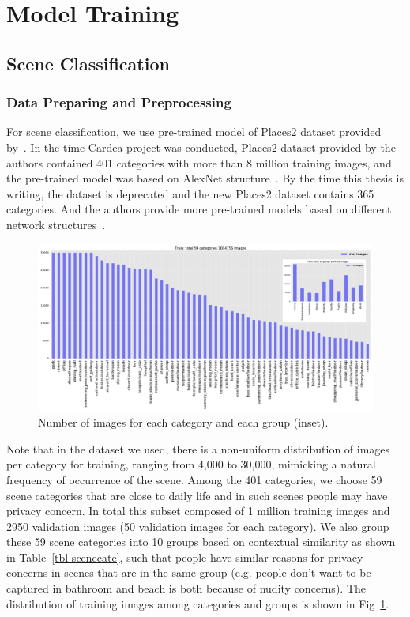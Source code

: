 \section{Model Training}

\subsection{Scene Classification}

\subsubsection{Data Preparing and Preprocessing}

For scene classification, we use pre-trained model of Places2 dataset provided by~\cite{links:places2mit}. In the time Cardea project was conducted, Places2 dataset provided by the authors contained 401 categories with more than 8 million training images, and the pre-trained model was based on AlexNet structure~\cite{krizhevsky2012imagenet}. By the time this thesis is writing, the dataset is deprecated and the new Places2 dataset contains 365 categories. And the authors provide more pre-trained models based on different network structures~\cite{links:places2pre}.

\begin{figure}[!htbp]
    \centering
    \includegraphics[width=1.0\textwidth]{figure/ch4-numdist.pdf}
    \caption{Number of images for each category and each group (inset).}
    \label{fig:ch4-scenenumdist}
\end{figure}

Note that in the dataset we used, there is a non-uniform distribution of images per category for training, ranging from 4,000 to 30,000, mimicking a natural frequency of occurrence of the scene. Among the 401 categories, we choose 59 scene categories that are close to daily life and in such scenes people may have privacy concern. In total this subset composed of 1 million training images and 2950 validation images (50 validation images for each category). We also group these 59 scene categories into 10 groups based on contextual similarity as shown in Table~\ref{tbl-scenecate}, such that people have similar reasons for privacy concerns in scenes that are in the same group (e.g. people don't want to be captured in bathroom and beach is both because of nudity concerns). The distribution of training images among categories and groups is shown in Fig~\ref{fig:ch4-scenenumdist}.

